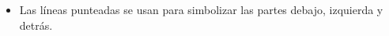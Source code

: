 \begin{itemize}
    \item Las líneas punteadas se usan para simbolizar las partes debajo, izquierda y detrás.
\end{itemize}



























% 
